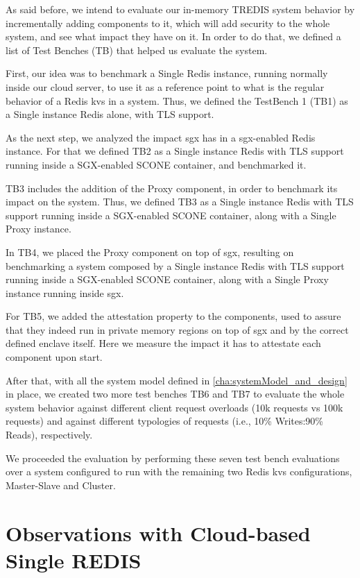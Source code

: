 As said before, we intend to evaluate our in-memory TREDIS system behavior by incrementally adding components to it, which will add security to the whole system, and see what impact they have on it. In order to do that, we defined a list of Test Benches (TB) that helped us evaluate the system. 

First, our idea was to benchmark a Single Redis instance, running normally inside our cloud server, to use it as a reference point to what is the regular behavior of a Redis \gls{kvs} in a system. Thus, we defined the TestBench 1 (TB1) as a Single instance Redis alone, with TLS support.

As the next step, we analyzed the impact \gls{sgx} has in a \gls{sgx}-enabled Redis instance. For that we defined TB2 as a Single instance Redis with TLS support running inside a SGX-enabled SCONE container, and benchmarked it.

TB3 includes the addition of the Proxy component, in order to benchmark its impact on the system. Thus, we defined TB3 as a Single instance Redis with TLS support running inside a SGX-enabled SCONE container, along with a Single Proxy instance.

In TB4, we placed the Proxy component on top of \gls{sgx}, resulting on benchmarking a system composed by a Single instance Redis with TLS support running inside a SGX-enabled SCONE container, along with a Single Proxy instance running inside \gls{sgx}.

For TB5, we added the attestation property to the components, used to assure that they indeed run in private memory regions on top of \gls{sgx} and by the correct defined enclave itself. Here we measure the impact it has to attestate each component upon start.

After that, with all the system model defined in \ref{cha:systemModel_and_design} in place, we created two more test benches TB6 and TB7 to evaluate the whole system behavior against different client request overloads (10k requests vs 100k requests) and against different typologies of requests (i.e., 10\% Writes:90\% Reads), respectively.

We proceeded the evaluation by performing these seven test bench evaluations over a system configured to run with the remaining two Redis \gls{kvs} configurations, Master-Slave and Cluster.


\section{Observations with Cloud-based Single REDIS}
\label{sec:cloudS_Redis}

